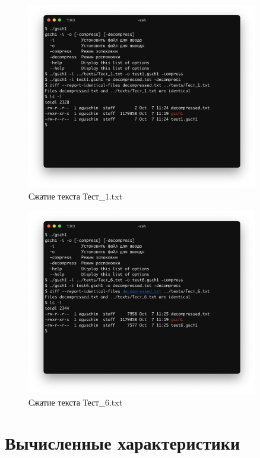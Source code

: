 \documentclass[a4paper,oneside]{article}
\theoremstyle{definition}
\begin{document}
\begin{figure}[H]
    \centering
    \includegraphics[width=0.9\textwidth]{test1.png}
    \caption{Сжатие текста Тест\_1.txt}
    \label{fig:test_1}
\end{figure}

\begin{figure}[H]
    \centering
    \includegraphics[width=0.9\textwidth]{test6.png}
    \caption{Сжатие текста Тест\_6.txt}
    \label{fig:test_6}
\end{figure}


\section{Вычисленные характеристики}
\end{document}
